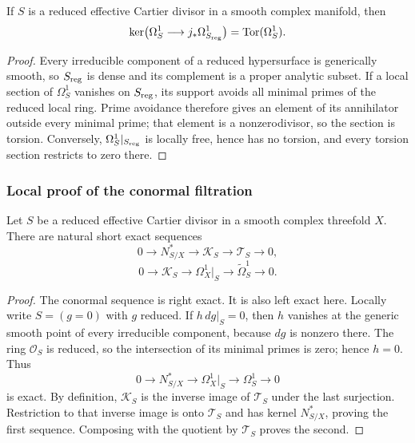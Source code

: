 \begin{lemma}
\label{wbII:lem:torsion-identification}
If $S$ is a reduced effective Cartier divisor in a smooth complex manifold,
then
\[
\ker\bigl(\Omega^1_S\longrightarrow j_*\Omega^1_{S_{\rm reg}}\bigr)
  =\operatorname{Tor}(\Omega^1_S).
\]
\end{lemma}

\begin{proof}
Every irreducible component of a reduced hypersurface is generically smooth,
so $S_{\rm reg}$ is dense and its complement is a proper analytic subset.
If a local section of $\Omega^1_S$ vanishes on $S_{\rm reg}$, its support avoids
all minimal primes of the reduced local ring.  Prime avoidance therefore gives
an element of its annihilator outside every minimal prime; that element is a
nonzerodivisor, so the section is torsion.  Conversely,
$\Omega^1_S|_{S_{\rm reg}}$ is locally free, hence has no torsion, and every
torsion section restricts to zero there.
\end{proof}

\subsubsection*{Local proof of the conormal filtration}


Let $S$ be a reduced effective Cartier divisor in a smooth complex
threefold $X$.  There are natural short exact sequences
\[
0\longrightarrow N^*_{S/X}\longrightarrow\mathscr K_S
\longrightarrow\mathscr T_S\longrightarrow0,
\]
\[
0\longrightarrow\mathscr K_S\longrightarrow\Omega_X^1|_S
\longrightarrow\widetilde\Omega_S^1\longrightarrow0.
\]



\begin{proof}
The conormal sequence is right exact.  It is also left exact here.  Locally
write $S=(g=0)$ with $g$ reduced.  If $h\,dg|_S=0$, then $h$ vanishes at the
generic smooth point of every irreducible component, because $dg$ is nonzero
there.  The ring $\mathcal O_S$ is reduced, so the intersection of its
minimal primes is zero; hence $h=0$.  Thus
\[
0\to N^*_{S/X}\to\Omega_X^1|_S\to\Omega_S^1\to0
\]
is exact.  By definition, $\mathscr K_S$ is the inverse image of
$\mathscr T_S$ under the last surjection.  Restriction to that inverse image
is onto $\mathscr T_S$ and has kernel $N^*_{S/X}$, proving the first
sequence.  Composing with the quotient by $\mathscr T_S$ proves the second.
\end{proof}

